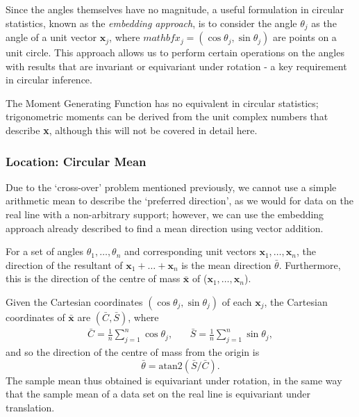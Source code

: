\documentclass[../../ArchStats.tex]{subfiles}
\begin{document}
Since the angles themselves have no magnitude, a useful formulation in circular statistics, known as the \textit{embedding approach}, is to consider the angle $\theta_j$ as the angle of a unit vector $\mathbf{x}_j$, where $mathbf{x}_j = (\cos\theta_j, \sin\theta_j)$ are points on a unit circle. This approach allows us to perform certain operations on the angles with results that are invariant or equivariant under rotation - a key requirement in circular inference.

The Moment Generating Function has no equivalent in circular statistics; trigonometric moments can be derived from the unit complex numbers that describe \textbf{x}, although this will not be covered in detail here.

\subsubsection{Location: Circular Mean}
\label{sec:circ-mean}

Due to the `cross-over' problem mentioned previously, we cannot use a simple arithmetic mean to describe the `preferred direction', as we would for data on the real line with a non-arbitrary support; however, we can use the embedding approach already described to find a mean direction using vector addition.

For a set of angles $\theta_1, \dots, \theta_n$ and corresponding unit vectors $\mathbf{x}_1, \dots, \mathbf{x}_n$, the direction of the resultant of $\mathbf{x}_1 + \dots + \mathbf{x}_n$ is the mean direction $\bar{\theta}$. Furthermore, this is the direction of the centre of mass $\mathbf{\bar{x}}$ of ($\mathbf{x}_1, \dots, \mathbf{x}_n$).

Given the Cartesian coordinates $(\cos\theta_j, \sin\theta_j)$ of each $\mathbf{x}_j$, the Cartesian coordinates of $\mathbf{\bar{x}}$ are $(\bar{C}, \bar{S})$, where
	\begin{equation}
	\label{eqn:C-and-S}
	\begin{matrix*}
	\displaystyle{\bar{C} = \frac{1}{n} \sum_{j=1}^{n} \cos \theta_j}, & \, & 
	\displaystyle{\bar{S} = \frac{1}{n} \sum_{j=1}^{n} \sin \theta_j},
	\end{matrix*}
	\end{equation}
and so the direction of the centre of mass from the origin is 
	\begin{equation}
	\label{eqn:circ-mean}
	\bar{\theta} = \text{atan2}(\bar{S}/\bar{C}).
	\end{equation}
The sample mean thus obtained is equivariant under rotation, in the same way that the sample mean of a data set on the real line is equivariant under translation.
\end{document}
